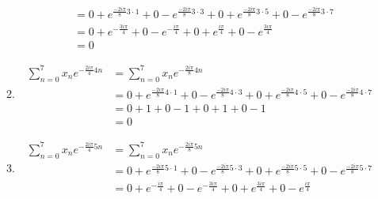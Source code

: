 \documentclass{article}
\begin{document}
\begin{enumerate}[label=\Alph*)]
\begin{enumerate}[label={k=\arabic*}, start=0]
\begin{align*}
                                                                           & = 0 + e^{\frac{-2 i \pi}{8} 3 \cdot 1} + 0 - e^{\frac{-2 i \pi}{8} 3 \cdot 3} + 0 + e^{\frac{-2 i \pi}{8} 3 \cdot 5} + 0 - e^{\frac{-2 i \pi}{8} 3 \cdot 7} \\
                                                                           & = 0 + e^{-\frac{3 i \pi}{4}} + 0 - e^{-\frac{i \pi}{4}} + 0 + e^{\frac{i \pi}{4}} + 0 - e^{\frac{3 i \pi}{4}}                                               \\
                                                                           & = 0
                        \end{align*}
                  \item \begin{align*}
                              \sum_{n=0}^{7}{x_n e^{-\frac{2 i \pi}{4}4n}} & = \sum_{n=0}^{7}{x_n e^{-\frac{2 i \pi}{8}4n}}                                                                                                              \\
                                                                           & = 0 + e^{\frac{-2 i \pi}{8} 4 \cdot 1} + 0 - e^{\frac{-2 i \pi}{8} 4 \cdot 3} + 0 + e^{\frac{-2 i \pi}{8} 4 \cdot 5} + 0 - e^{\frac{-2 i \pi}{8} 4 \cdot 7} \\
                                                                           & = 0 + 1 + 0 - 1 + 0 + 1 + 0 - 1                                                                                                                             \\
                                                                           & = 0
                        \end{align*}
                  \item \begin{align*}
                              \sum_{n=0}^{7}{x_n e^{-\frac{2 i \pi}{4}5n}} & = \sum_{n=0}^{7}{x_n e^{-\frac{2 i \pi}{8}5n}}                                                                                                              \\
                                                                           & = 0 + e^{\frac{-2 i \pi}{8} 5 \cdot 1} + 0 - e^{\frac{-2 i \pi}{8} 5 \cdot 3} + 0 + e^{\frac{-2 i \pi}{8} 5 \cdot 5} + 0 - e^{\frac{-2 i \pi}{8} 5 \cdot 7} \\
                                                                           & = 0 + e^{-\frac{i \pi}{4}} + 0 - e^{-\frac{3 i \pi}{4}} + 0 + e^{\frac{3 i \pi}{4}} + 0 - e^{\frac{i \pi}{4}}                                               \\

\end{align*}
\end{enumerate}
\end{enumerate}
\end{document}
